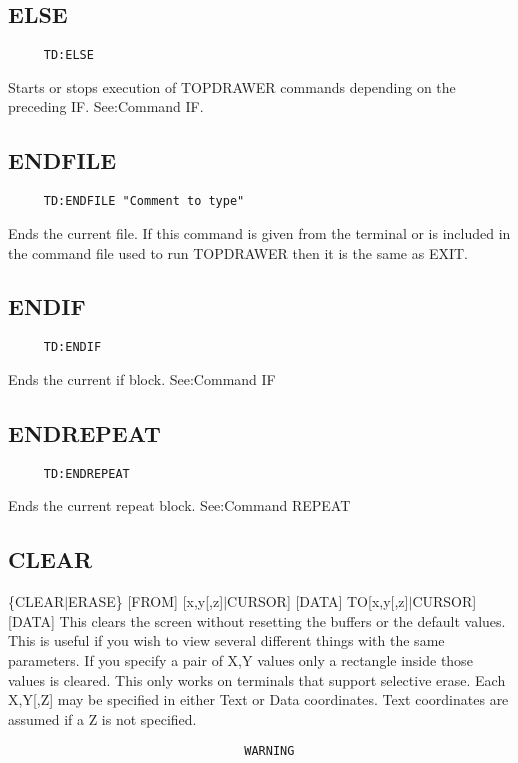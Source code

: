 \subsection{ELSE}
\begin{verbatim}
     TD:ELSE 
\end{verbatim}
Starts  or  stops  execution  of  TOPDRAWER  commands  depending  on  the
preceding IF.  See:Command IF.  
\subsection{ENDFILE}
\begin{verbatim}
     TD:ENDFILE "Comment to type" 
\end{verbatim}
Ends  the current file.  If this command is given from the terminal or is
included in the command file used to run TOPDRAWER then it is the same as
EXIT.  
\subsection{ENDIF}
\begin{verbatim}
     TD:ENDIF 
\end{verbatim}
Ends the current if block.  See:Command IF 
\subsection{ENDREPEAT}
\begin{verbatim}
     TD:ENDREPEAT 
\end{verbatim}
Ends the current repeat block.  See:Command REPEAT 
\subsection{CLEAR}
\{CLEAR$|$ERASE\} [FROM] [x,y[,z]$|$CURSOR] [DATA] TO[x,y[,z]$|$CURSOR] [DATA] 
This  clears  the  screen  without  resetting  the buffers or the default
values.  This is useful if you wish to view several different things with
the  same  parameters.   If  you  specify  a  pair  of  X,Y values only a
rectangle inside those values is cleared.  This only works  on  terminals
that  support  selective  erase.  Each X,Y[,Z] may be specified in either
Text or Data coordinates.  Text coordinates are assumed if  a  Z  is  not
specified.  



\begin{verbatim}
                                 WARNING
\end{verbatim}

